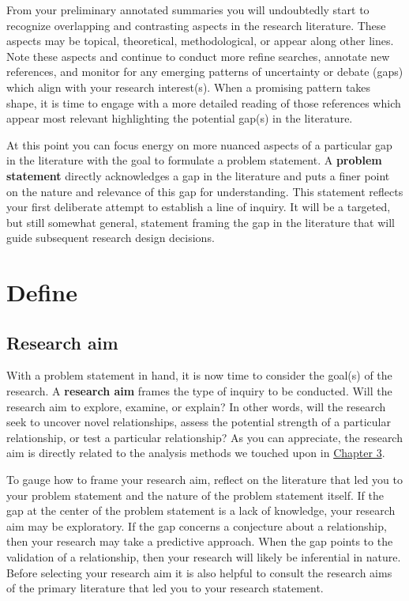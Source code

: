 \documentclass[
  letterpaper,
  DIV=11,
  numbers=noendperiod]{scrreport}
\theoremstyle{definition}
\theoremstyle{remark}
\begin{document}
From your preliminary annotated summaries you will undoubtedly start to
recognize overlapping and contrasting aspects in the research
literature. These aspects may be topical, theoretical, methodological,
or appear along other lines. Note these aspects and continue to conduct
more refine searches, annotate new references, and monitor for any
emerging patterns of uncertainty or debate (gaps) which align with your
research interest(s). When a promising pattern takes shape, it is time
to engage with a more detailed reading of those references which appear
most relevant highlighting the potential gap(s) in the literature.

At this point you can focus energy on more nuanced aspects of a
particular gap in the literature with the goal to formulate a problem
statement. A \textbf{problem statement} directly acknowledges a gap in
the literature and puts a finer point on the nature and relevance of
this gap for understanding. This statement reflects your first
deliberate attempt to establish a line of inquiry. It will be a
targeted, but still somewhat general, statement framing the gap in the
literature that will guide subsequent research design decisions.

\hypertarget{sec-fr-define}{%
\section{Define}\label{sec-fr-define}}

\hypertarget{sec-fr-aim}{%
\subsection{Research aim}\label{sec-fr-aim}}

With a problem statement in hand, it is now time to consider the goal(s)
of the research. A \textbf{research aim} frames the type of inquiry to
be conducted. Will the research aim to explore, examine, or explain? In
other words, will the research seek to uncover novel relationships,
assess the potential strength of a particular relationship, or test a
particular relationship? As you can appreciate, the research aim is
directly related to the analysis methods we touched upon in
\protect\hyperlink{sec-approaching-analysis}{Chapter 3}.

To gauge how to frame your research aim, reflect on the literature that
led you to your problem statement and the nature of the problem
statement itself. If the gap at the center of the problem statement is a
lack of knowledge, your research aim may be exploratory. If the gap
concerns a conjecture about a relationship, then your research may take
a predictive approach. When the gap points to the validation of a
relationship, then your research will likely be inferential in nature.
Before selecting your research aim it is also helpful to consult the
research aims of the primary literature that led you to your research
statement.
\end{document}
